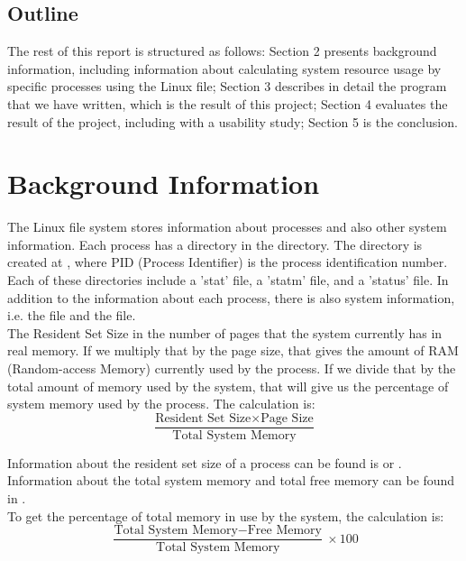 \documentclass[12pt]{article}
\begin{document}
	\subsection{Outline}
	The rest of this report is structured as follows: Section 2 presents background information, including information about calculating system resource usage by specific processes using the Linux  file; Section 3 describes in detail the program that we have written, which is the result of this project; Section 4 evaluates the result of the project, including with a usability study; Section 5 is the conclusion.
	
	\section{Background Information}
	The Linux  file system stores information about processes and also other system information.
Each process has a directory in the  directory\cite[p. 792]{text}.
The directory is created at , where PID (Process Identifier) is the process identification number. Each of these directories include a 'stat' file, a 'statm' file, and a 'status' file. In addition to the information about each process, there is also system information, i.e. the  file and the  file.\\
	The Resident Set Size in the number of pages that the system currently has in real memory.
	If we multiply that by the page size, that gives the amount of RAM (Random-access Memory) currently used by the process.
	If we divide that by the total amount of memory used by the system, that will give us the percentage of system memory used by the process.
	The calculation is:\\
	$$ \frac{\text{Resident Set Size} \times \text{Page Size}}{\text{Total System Memory}} $$
	
	Information about the resident set size of a process can be found is  or \cite{manProc}.
	Information about the total system memory and total free memory can be found in  \cite{manProc}.\\
	To get the percentage of total memory in use by the system, the calculation is:\\
	$$ \frac{\text{Total System Memory} - \text{Free Memory}}{\text{Total System Memory}} \times 100 $$
	
\end{document}
